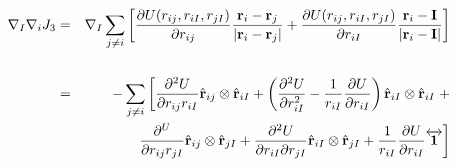 \documentclass[letterpaper]{article}
\begin{document}
\begin{eqnarray}
\nabla_I \nabla_i J_3 & = & \nabla_I \sum_{j \neq i}
\left[\frac{\partial U(r_{ij}, r_{iI},r_{jI})}{\partial r_{ij}}
  \frac{\mathbf{r}_i - \mathbf{r}_j}{|\mathbf{r}_i - \mathbf{r}_j|} 
+ \frac{\partial U(r_{ij}, r_{iI},r_{jI})}{\partial r_{iI}}
  \frac{\mathbf{r}_i - \mathbf{I}}{|\mathbf{r}_i - \mathbf{I}|}  \right] \\\nonumber \\\nonumber
& = & -\sum_{j\neq i} \left[ 
\frac{\partial^2 U}{\partial r_{ij} r_{iI}} \hat{\mathbf{r}}_{ij} \otimes
\hat{\mathbf{r}}_{iI} + \left(\frac{\partial^2 U}{\partial r_{iI}^2} -
\frac{1}{r_{iI}} \frac{\partial U}{\partial r_{iI}}\right)
\hat{\mathbf{r}}_{iI} \otimes \hat{\mathbf{r}}_{iI} \right. + \\\nonumber
& & \left. \qquad \ \ \  \frac{\partial^U}{\partial r_{ij} r_{jI}} \hat{\mathbf{r}}_{ij} \otimes \hat{\mathbf{r}}_{jI} + \frac{\partial^2 U}{\partial r_{iI} \partial r_{jI}}
\hat{\mathbf{r}}_{iI}\otimes \hat{\mathbf{r}}_{jI}  +
\frac{1}{r_{iI}} \frac{\partial U}{\partial r_{iI}} \overleftrightarrow{\mathbf{1}}\right]
\end{eqnarray}
\end{document}
